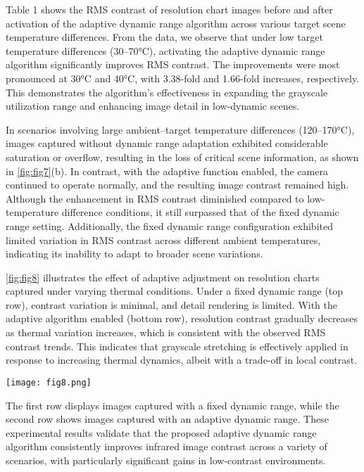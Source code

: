 \documentclass[a4paper,fleqn]{cas-dc}
\begin{document}
Table 1 shows the RMS contrast of resolution chart images before and after activation of the adaptive dynamic range algorithm across various target scene temperature differences. From the data, we observe that under low target temperature differences (30–70°C), activating the adaptive dynamic range algorithm significantly improves RMS contrast. The improvements were most pronounced at 30°C and 40°C, with 3.38-fold and 1.66-fold increases, respectively. This demonstrates the algorithm's effectiveness in expanding the grayscale utilization range and enhancing image detail in low-dynamic scenes.

In scenarios involving large ambient–target temperature differences (120–170°C), images captured without dynamic range adaptation exhibited considerable saturation or overflow, resulting in the loss of critical scene information, as shown in \cref{fig:fig7}(b). In contrast, with the adaptive function enabled, the camera continued to operate normally, and the resulting image contrast remained high. Although the enhancement in RMS contrast diminished compared to low-temperature difference conditions, it still surpassed that of the fixed dynamic range setting. Additionally, the fixed dynamic range configuration exhibited limited variation in RMS contrast across different ambient temperatures, indicating its inability to adapt to broader scene variations.



\cref{fig:fig8} illustrates the effect of adaptive adjustment on resolution charts captured under varying thermal conditions. Under a fixed dynamic range (top row), contrast variation is minimal, and detail rendering is limited. With the adaptive algorithm enabled (bottom row), resolution contrast gradually decreases as thermal variation increases, which is consistent with the observed RMS contrast trends. This indicates that grayscale stretching is effectively applied in response to increasing thermal dynamics, albeit with a trade-off in local contrast.

  \begin{figure*}[ht]
    \centering
    \texttt{[image: fig8.png]}
    \caption{Observation of the same resolution target under varying target temperature differences. }
    \label{fig:fig8}
\end{figure*}

The first row displays images captured with a fixed dynamic range, while the second row shows images captured with an adaptive dynamic range.
These experimental results validate that the proposed adaptive dynamic range algorithm consistently improves infrared image contrast across a variety of scenarios, with particularly significant gains in low-contrast environments.
\end{document}
